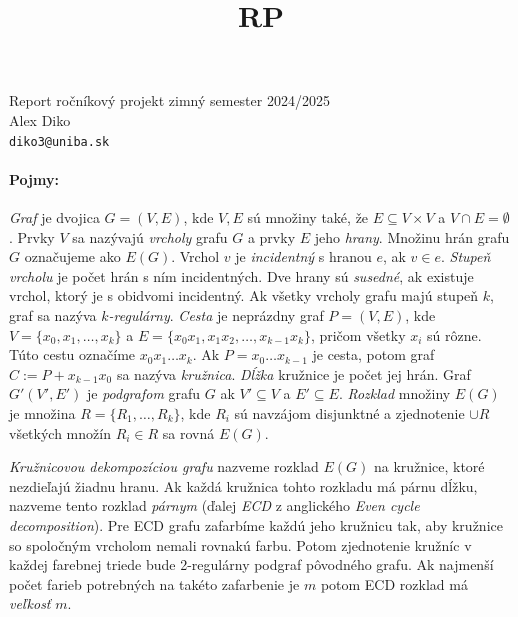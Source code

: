 \documentclass[11pt]{article}
\begin{document}
\title{RP}
\begin{center}
    {\LARGE Report ročníkový projekt zimný semester 2024/2025}\\[1em]
    {\large Alex Diko  \\ \texttt{diko3@uniba.sk}}\\[1em]
\end{center}

\paragraph{Pojmy:}

\textit{Graf} je dvojica $G = (V,E)$, kde $V,E$ sú množiny také, že $E \subseteq V\times V$
a $V \cap E = \emptyset$. Prvky $V$ sa nazývajú \textit{vrcholy} grafu $G$ a prvky $E$ jeho \textit{hrany}.
Množinu hrán grafu $G$ označujeme ako $E(G)$. Vrchol 
$v$ je \textit{incidentný} s hranou $e$, ak $v\in e$. \textit{Stupeň vrcholu} je počet
hrán s ním incidentných. Dve hrany sú \textit{susedné}, ak existuje vrchol, ktorý je 
s obidvomi incidentný. Ak všetky vrcholy grafu
majú stupeň $k$, graf sa nazýva \textit{$k$-regulárny}. \textit{Cesta} je neprázdny graf $P = (V,E)$,
kde $V = \{x_0, x_1, \ldots, x_k\}$ a $E = \{x_0x_1, x_1x_2, \ldots, x_{k-1}x_k\}$,
pričom všetky $x_i$ sú rôzne. Túto cestu označíme $x_0x_1\ldots x_k$. Ak $P = x_0\ldots x_{k-1}$ je cesta, potom
graf $C := P + x_{k-1}x_0$ sa nazýva \textit{kružnica}. \textit{Dĺžka} kružnice je počet jej hrán. Graf
$ G'(V',E')$ je \textit{podgrafom} grafu $G$ ak $V' \subseteq V$ a $E' \subseteq E$.
\textit{Rozklad} množiny $E(G)$ je množina $R = \{R_1, \ldots, R_k\}$, kde $R_i$
sú navzájom disjunktné a zjednotenie $\cup R$ všetkých množín $R_i \in R$ sa rovná $E(G)$. \cite{diestel2024graph}

\textit{Kružnicovou dekompozíciou grafu} nazveme rozklad $E(G)$ na kružnice, ktoré nezdieľajú žiadnu
hranu. Ak každá kružnica tohto rozkladu má párnu dĺžku, nazveme tento rozklad \textit{párnym} (ďalej
\textit{ECD} z anglického \textit{Even cycle decomposition}).
Pre ECD grafu zafarbíme každú jeho kružnicu tak, aby kružnice so spoločným
vrcholom nemali rovnakú farbu. Potom zjednotenie kružníc v každej farebnej triede 
bude 2-regulárny podgraf pôvodného grafu. Ak najmenší počet farieb potrebných 
na takéto zafarbenie je $m$ potom ECD rozklad má \textit{veľkosť} $m$. \cite{MALNEGRO2024113844}
\end{document}
